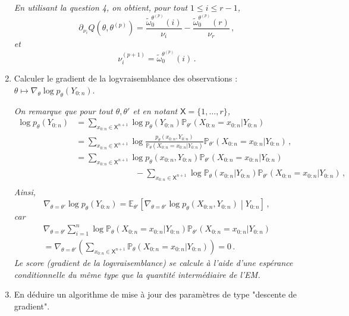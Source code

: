 \documentclass[a4paper,10pt,fleqn]{article}
\newcommand{\1}{\ensuremath{\mathbbm{1}}}
\begin{document}
\begin{enumerate}
\vspace{.2cm}

{\em
En utilisant la question 4, on obtient, pour tout $1\leq i \leq r-1$, 
$$
\partial_{\nu_i}Q(\theta,\theta^{(p)}) = \frac{\tilde\omega_{0}^{\theta^{(p)}}(i)}{\nu_i} - \frac{\tilde\omega_{0}^{\theta^{(p)}}(r)}{\nu_r}\,,
$$
et
$$
\nu_i^{(p+1)} = \tilde\omega_{0}^{\theta^{(p)}}(i)\,.
$$
}
\item Calculer le gradient de la logvraisemblance des observations : $\theta\mapsto\nabla_\theta \log p_\theta(Y_{0:n})$.

\vspace{.2cm}

{\em
On remarque que pour tout $\theta,\theta'$ et en notant $\mathsf{X} = \{1,\ldots,r\}$,
\begin{align*}
\log p_\theta(Y_{0:n}) &= \sum_{x_{0:n}\in\mathsf{X}^{n+1}} \log p_\theta(Y_{0:n}) \mathbb{P}_{\theta'}(X_{0:n} = x_{0:n}|Y_{0:n})\,\\
&= \sum_{x_{0:n}\in\mathsf{X}^{n+1}} \log \frac{p_\theta( x_{0:n},Y_{0:n})}{\mathbb{P}_\theta(X_{0:n} = x_{0:n}|Y_{0:n})} \mathbb{P}_{\theta'}(X_{0:n} = x_{0:n}|Y_{0:n}) \,,\\
&= \sum_{x_{0:n}\in\mathsf{X}^{n+1}} \log p_\theta(x_{0:n},Y_{0:n})\mathbb{P}_{\theta'}(X_{0:n} = x_{0:n}|Y_{0:n})  \\
&\hspace{3cm}- \sum_{x_{0:n}\in\mathsf{X}^{n+1}} \log \mathbb{P}_\theta(x_{0:n}|Y_{0:n})\mathbb{P}_{\theta'}(X_{0:n} = x_{0:n}|Y_{0:n})\,,\\
\end{align*}
Ainsi,
$$
\nabla_{\theta=\theta'}\log p_\theta(Y_{0:n}) = \mathbb{E}_{\theta'}\left[\nabla_{\theta=\theta'}\log p_\theta(X_{0:n},Y_{0:n}) \middle |Y_{0:n}\right]\,,
$$
car
\begin{multline*}
\nabla_{\theta=\theta'}\sum_{i=1}^n \log \mathbb{P}_\theta(X_{0:n} = x_{0:n}|Y_{0:n})\mathbb{P}_{\theta'}(X_{0:n} = x_{0:n}|Y_{0:n})\\
=\nabla_{\theta=\theta'}\left(\sum_{x_{0:n}\in\mathsf{X}^{n+1}}  \mathbb{P}_\theta(X_{0:n} = x_{0:n}|Y_{0:n})\right)  = 0\,.
\end{multline*}
Le score (gradient de la logvraisemblance) se calcule \`a l'aide d'une esp\'erance conditionnelle du m\^eme type que la quantit\'e interm\'ediaire de l'EM.
}
\item En d\'eduire un algorithme de mise \`a jour des param\`etres de type "descente de gradient".

\vspace{.2cm}


\end{enumerate}
\end{document}
